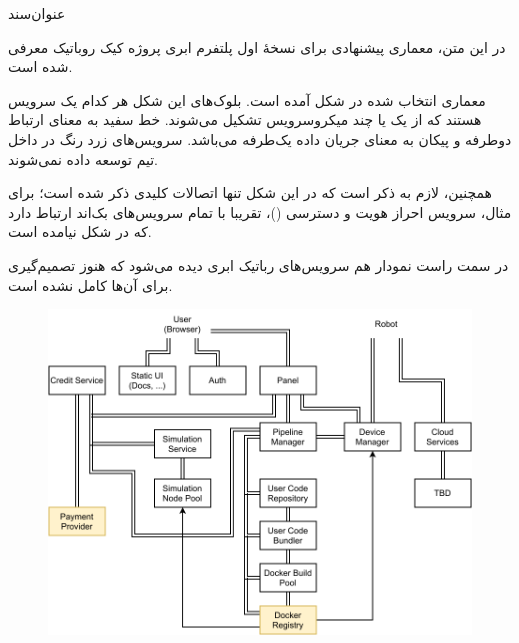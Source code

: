\documentclass{cake-classes/short-report-fa}
\begin{document}
‌عنوان‌سند

در این متن، معماری پیشنهادی برای نسخهٔ اول پلتفرم ابری پروژه کیک روباتیک معرفی شده است.


معماری انتخاب شده در شکل  آمده است. بلوک‌های این شکل هر کدام یک سرویس هستند که از یک یا چند میکروسرویس تشکیل می‌شوند. خط سفید به معنای ارتباط دوطرفه و پیکان به معنای جریان داده یک‌طرفه می‌باشد. سرویس‌های زرد رنگ در داخل تیم توسعه داده نمی‌شوند.

همچنین، لازم به ذکر است که در این شکل تنها اتصالات کلیدی ذکر شده است؛ برای مثال، سرویس احراز هویت و دسترسی ()، تقریبا با تمام سرویس‌های بک‌اند ارتباط دارد که در شکل نیامده است.

در سمت راست نمودار هم سرویس‌های رباتیک ابری دیده می‌شود که هنوز تصمیم‌گیری برای آن‌ها کامل نشده است.

\begin{figure}[p]
	\centering
	\includegraphics[width=\linewidth]{arch.pdf}
\end{figure}
\end{document}
